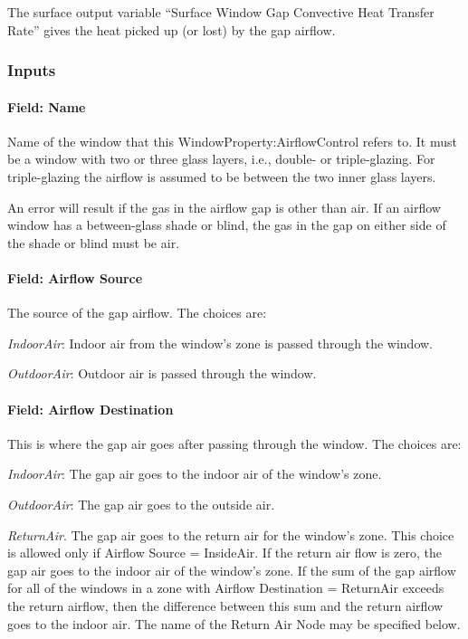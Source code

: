 The surface output variable ``Surface Window Gap Convective Heat Transfer Rate'' gives the heat picked up (or lost) by the gap airflow.

\subsubsection{Inputs}\label{inputs-34-001}

\paragraph{Field: Name}\label{field-name-31-001}

Name of the window that this WindowProperty:AirflowControl refers to. It must be a window with two or three glass layers, i.e., double- or triple-glazing. For triple-glazing the airflow is assumed to be between the two inner glass layers.

An error will result if the gas in the airflow gap is other than air. If an airflow window has a between-glass shade or blind, the gas in the gap on either side of the shade or blind must be air.

\paragraph{Field: Airflow Source}\label{field-airflow-source}

The source of the gap airflow. The choices are:

\emph{IndoorAir}: Indoor air from the window's zone is passed through the window.

\emph{OutdoorAir}: Outdoor air is passed through the window.

\paragraph{Field: Airflow Destination}\label{field-airflow-destination}

This is where the gap air goes after passing through the window. The choices are:

\emph{IndoorAir}: The gap air goes to the indoor air of the window's zone.

\emph{OutdoorAir}: The gap air goes to the outside air.

\emph{ReturnAir}. The gap air goes to the return air for the window's zone. This choice is allowed only if Airflow Source = InsideAir. If the return air flow is zero, the gap air goes to the indoor air of the window's zone. If the sum of the gap airflow for all of the windows in a zone with Airflow Destination = ReturnAir exceeds the return airflow, then the difference between this sum and the return airflow goes to the indoor air. The name of the Return Air Node may be specified below.

